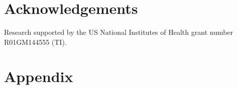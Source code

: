 \documentclass[iucr]{iucrjournals}
\begin{document}
\section*{Acknowledgements}
Research supported by the US National Institutes of Health grant number R01GM144555 (TI).






\section*{Appendix}
\appendix

\end{document}
